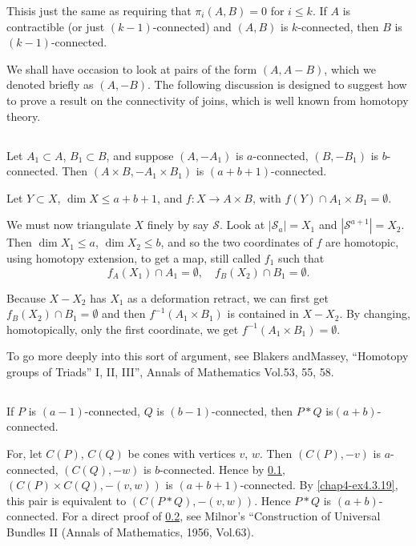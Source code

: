 This\pageoriginale is just the same as requiring that $\pi_{i}(A,B)=0$ for $i\leq k$. If $A$ is contractible (or just $(k-1)$-connected) and $(A,B)$ is $k$-connected, then $B$ is $(k-1)$-connected.

We shall have occasion to look at pairs of the form $(A,A-B)$, which we denoted briefly as $(A,-B)$. The following discussion is designed to suggest how to prove a result on the connectivity of joins, which is well known from homotopy theory. 

\subsection{}\label{chap4-sec4.5.3}
Let $A_{1}\subset A$, $B_{1}\subset B$, and suppose $(A,-A_{1})$ is $a$-connected, $(B,-B_{1})$ is $b$-connected. Then $(A\times B,-A_{1}\times B_{1})$ is $(a+b+1)$-connected.

Let $Y\subset X$, $\dim X\leq a+b+1$, and $f:X\to A\times B$, with $f(Y)\cap A_{1}\times B_{1}=\emptyset$.

We must now triangulate $X$ finely by say $\mathscr{S}$. Look at $|\mathscr{S}_{a}|=X_{1}$ and $|\mathscr{S}^{a+1}|=X_{2}$. Then $\dim X_{1}\leq a$, $\dim X_{2}\leq b$, and so the two coordinates of $f$ are homotopic, using homotopy extension, to get a map, still called $f_{1}$ such that
$$
f_{A}(X_{1})\cap A_{1}=\emptyset,\quad f_{B}(X_{2})\cap B_{1}=\emptyset.
$$

Because $X-X_{2}$ has $X_{1}$ as a deformation retract, we can first get $f_{B}(X_{2})\cap B_{1}=\emptyset$ and then $f^{-1}(A_{1}\times B_{1})$ is contained in $X-X_{2}$. By changing, homotopically, only the first coordinate, we get $f^{-1}(A_{1}\times B_{1})=\emptyset$.

To go more deeply into this sort of argument, see Blakers and\break Massey, ``Homotopy groups of Triads'' I, II, III'', Annals of Mathematics Vol.\@ 53, 55, 58.

\subsection{}\label{chap4-sec4.5.4}
If $P$ is $(a-1)$-connected, $Q$ is $(b-1)$-connected, then $P\ast Q$ is\pageoriginale $(a+b)$-connected.

For, let $C(P)$, $C(Q)$ be cones with vertices $v$, $w$. Then $(C(P),-v)$ is $a$-connected, $(C(Q),-w)$ is $b$-connected. Hence by \ref{chap4-sec4.5.3}, $(C(P)\times C(Q),-(v,w))$ is $(a+b+1)$-connected. By \ref{chap4-ex4.3.19}, this pair is equivalent to $(C(P\ast Q),-(v,w))$. Hence $P\ast Q$ is $(a+b)$-connected. For a direct proof of \ref{chap4-sec4.5.4}, see Milnor's ``Construction of Universal Bundles II (Annals of Mathematics, 1956, Vol.\@ 63).

